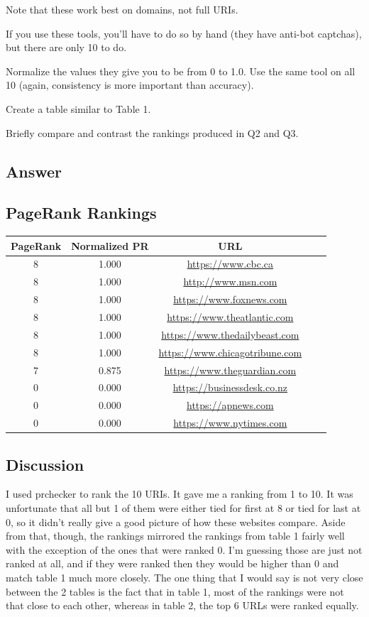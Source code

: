 \documentclass[12pt]{article}
\begin{document}
Note that these work best on domains, not full URIs.

If you use these tools, you'll have to do so by hand (they have anti-bot captchas), but there are only 10 to do.

Normalize the values they give you to be from 0 to 1.0. Use the same tool on all 10 (again, consistency is more important than accuracy).

Create a table similar to Table 1.

Briefly compare and contrast the rankings produced in Q2 and Q3.

\subsection*{Answer}
\subsection*{PageRank Rankings}
\begin{center}
\begin{tabular}{ |c|c|c|c|c| } 
 \hline
 \textbf{PageRank} & \textbf{Normalized PR} & \textbf{URL}\\
 \hline
 8 & 1.000 & \url{https://www.cbc.ca}\\
 8 & 1.000 & \url{http://www.msn.com}\\
 8 & 1.000 & \url{https://www.foxnews.com}\\
 8 & 1.000 & \url{https://www.theatlantic.com}\\
 8 & 1.000 & \url{https://www.thedailybeast.com}\\
 8 & 1.000 & \url{https://www.chicagotribune.com}\\
 7 & 0.875 & \url{https://www.theguardian.com}\\
 0 & 0.000 & \url{https://businessdesk.co.nz}\\
 0 & 0.000 & \url{https://apnews.com}\\
 0 & 0.000 & \url{https://www.nytimes.com}\\
 \hline
\end{tabular}
\end{center}

\subsection*{Discussion}
I used prchecker to rank the 10 URIs. It gave me a ranking from 1 to 10. It was unfortunate that all but 1 of them were either tied for first at 8 or tied for last at 0, so it didn't really give a good picture of how these websites compare. Aside from that, though, the rankings mirrored the rankings from table 1 fairly well with the exception of the ones that were ranked 0. I'm guessing those are just not ranked at all, and if they were ranked then they would be higher than 0 and match table 1 much more closely. The one thing that I would say is not very close between the 2 tables is the fact that in table 1, most of the rankings were not that close to each other, whereas in table 2, the top 6 URLs were ranked equally.
\end{document}
